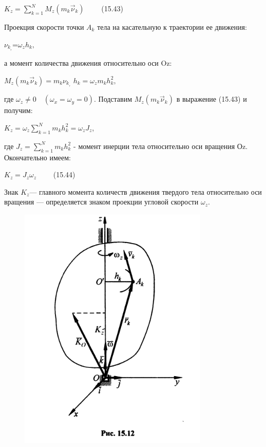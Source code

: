 {\begin{center}
    \par $K_z=\sum\limits_{k=1}^N M_z(m_k \vec{\nu}_k) \qquad$ (15.43)

    \par Проекция  скорости  точки $A_k$  тела  на касательную к траектории ее движения:

    \par $\nu_{k}__{\tau}$=${\omega}_{z} h_k,$

    \par а момент количества движения относительно оси Oz:

    \par $M_z(m_k \vec{\nu}_k)=m_k\nu_{k}__{\tau}$ $h_{k}=\omega_z m_k h_k^{2},$

    \par где $\omega_z \neq 0 \quad (\omega_x = \omega_y = 0).$ Подставим $M_z(m_k \vec{\nu}_k)$ в выражение (15.43) и получим:

    \par $K_z=\omega_z \sum\limits_{k=1}^N m_k h_k^{2} = \omega_z J_z$, 

    \par где $J_z=\sum\limits_{k=1}^N m_k h_k^{2}$ - момент инерции тела относительно оси вращения Оz. Окончательно имеем:

    \par $K_z=J_z\omega_z \qquad$ (15.44)

    \par Знак $K_z$— главного момента количеств движения твердого тела относительно оси вращения — определяется знаком проекции угловой скорости $\omega_z$.

    \par \begin{figure}[H]
    \centering \includegraphics[scale = 0.5]{img/15.12.jpeg}
    \end{figure}


\end{center}}

